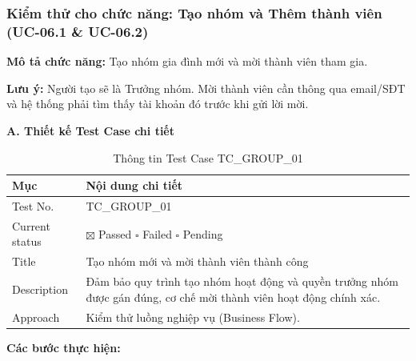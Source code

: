 \subsubsection{Kiểm thử cho chức năng: Tạo nhóm và Thêm thành viên (UC-06.1 \& UC-06.2)}

\textbf{Mô tả chức năng:} Tạo nhóm gia đình mới và mời thành viên tham gia.

\textbf{Lưu ý:} Người tạo sẽ là Trưởng nhóm. Mời thành viên cần thông qua email/SĐT và hệ thống phải tìm thấy tài khoản đó trước khi gửi lời mời.

\vspace{0.5cm}
\textbf{A. Thiết kế Test Case chi tiết}

\begin{table}[H]
\centering
\begin{tabular}{|p{3.5cm}|p{11cm}|}
\hline
\textbf{Mục} & \textbf{Nội dung chi tiết} \\
\hline
Test No. & TC\_GROUP\_01 \\
\hline
Current status & $\boxtimes$ Passed \hspace{0.5cm} $\square$ Failed \hspace{0.5cm} $\square$ Pending \\
\hline
Title & Tạo nhóm mới và mời thành viên thành công \\
\hline
Description & Đảm bảo quy trình tạo nhóm hoạt động và quyền trưởng nhóm được gán đúng, cơ chế mời thành viên hoạt động chính xác. \\
\hline
Approach & Kiểm thử luồng nghiệp vụ (Business Flow). \\
\hline
\end{tabular}
\caption{Thông tin Test Case TC\_GROUP\_01}
\end{table}

\textbf{Các bước thực hiện:}

